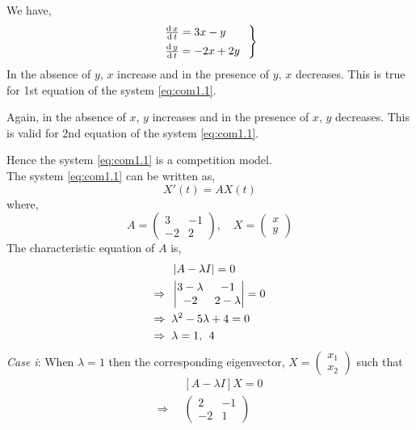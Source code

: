 \documentclass[../main-sheet.tex]{subfiles}
\begin{document}
\begin{soln}
    We have,
    \begin{equation}
        \begin{rcases}
            \,\frac{\mathrm{d}\,x}{\mathrm{d}\,t}=3x-y\qquad\\
        \,\frac{\mathrm{d}\,y}{\mathrm{d}\,t}=-2x+2y
        \end{rcases}
        \label{eq:com1.1}
    \end{equation}
    In the absence of \(y\), \(x\) increase and in the presence of \(y\), \(x\) decreases. This is true for 1st equation of the system \eqref{eq:com1.1}.

    Again, in the absence of \(x\), \(y\) increases and in the presence of \(x\), \(y\) decreases. This is valid for 2nd equation of the system \eqref{eq:com1.1}.

    Hence the system \eqref{eq:com1.1} is a competition model.\\
    The system \eqref{eq:com1.1} can be written as,
    \[X'(t)=AX(t)\]
    where,
    \[A=\begin{pmatrix}
        3&-1\\
        -2&2
    \end{pmatrix},\quad X=\begin{pmatrix}
        x\\
        y
    \end{pmatrix}\]
    The characteristic equation of \(A \) is,
    \begin{align*}
        &\left\vert A-\lambda I\right\vert=0\\
        \Rightarrow\;\;&\begin{vmatrix}
            3-\lambda & -1\\
            -2 & 2-\lambda
        \end{vmatrix}=0\\
        \Rightarrow\;\;&\lambda^2-5\lambda+4=0\\
        \Rightarrow\;\;&\lambda=1,\,\;4
    \end{align*}
    \emph{Case i}: When \(\lambda=1\) then the corresponding eigenvector, \(\displaystyle X=\begin{pmatrix}
        x_1\\
        x_2
    \end{pmatrix}\) such that
    \begin{align*}
        &[A-\lambda I]X=0\\
        \Rightarrow\;\;&\begin{pmatrix}
            2&-1\\
            -2&1

\end{pmatrix}
\end{align*}
\end{soln}
\end{document}
